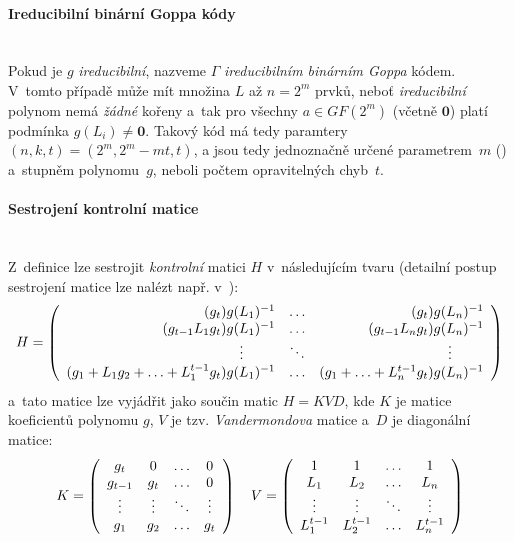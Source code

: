 \documentclass[thesis=M,czech,hidelinks]{FITthesis}[2012/06/26]
\newcommand{\0}{{\textcolor[gray]{0.75}{0}}}
\begin{document}
\paragraph{Ireducibilní binární Goppa kódy} \hfil \\
Pokud je $g$ \emph{ireducibilní}, nazveme $\Gamma$ \emph{ireducibilním
binárním Goppa} kódem. V~tomto případě může mít množina $L$ až $n=2^m$ prvků,
neboť \emph{ireducibilní} polynom nemá \emph{žádné} kořeny a~tak pro všechny
$a \in GF(2^m)$ (včetně $\mathbf{0}$) platí podmínka $g(L_i) \neq \mathbf{0}$.
Takový kód má tedy paramtery $(n,k,t) = ( 2^m, 2^m - mt, t )$, a jsou tedy
jednoznačně určené parametrem~$m$ () a~stupněm
polynomu~$g$, neboli počtem opravitelných chyb~$t$.

\paragraph{Sestrojení kontrolní matice} \hfil \\
Z~definice lze sestrojit \emph{kontrolní} matici $H$ v~následujícím tvaru
(detailní postup sestrojení matice lze nalézt např. v~\cite{Kotil}):
$$
    H = \left(\begin{array}{r c r}
        (           g_t) g(L_1)^{-1} & \ldots & (           g_t) g(L_n)^{-1} \\
        (g_{t-1}L_1 g_t) g(L_1)^{-1} & \ldots & (g_{t-1}L_n g_t) g(L_n)^{-1} \\
        \vdots \qquad \;             & \ddots & \vdots \qquad \;             \\
        (g_1 + L_1 g_2 + \ldots + L_1^{t-1} g_t) g(L_1)^{-1} &
            \ldots  &
            (g_1 + \ldots + L_n^{t-1} g_t) g(L_n)^{-1} \\
    \end{array}\right)
$$
a~tato matice lze vyjádřit jako součin matic $ H = KVD $, kde $K$ je matice
koeficientů polynomu $g$, $V$ je tzv.  \emph{Vandermondova} matice a~$D$ je
diagonální matice:
$$
    K = \left(\begin{array}{c c c c}
        g_t     & 0      & \ldots & 0      \\
        g_{t-1} & g_t    & \ldots & 0      \\
        \vdots  & \vdots & \ddots & \vdots \\
        g_1     & g_2    & \ldots & g_t    \\
    \end{array}\right)
    \quad
    V = \left(\begin{array}{c c c c}
        1         & 1         & \ldots & 1         \\
        L_1       & L_2       & \ldots & L_n       \\
        \vdots    & \vdots    & \ddots & \vdots    \\
        L_1^{t-1} & L_2^{t-1} & \ldots & L_n^{t-1} \\
    \end{array}\right)
$$
\end{document}
